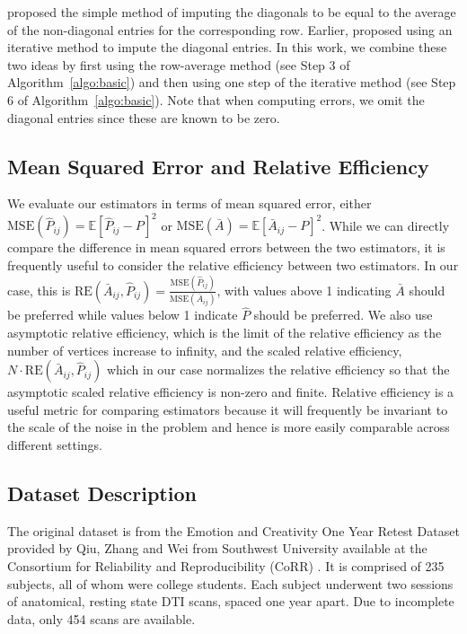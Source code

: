 \documentclass[10pt,letterpaper]{article}
\newcommand{\Ex}{\mathbb{E}}
\renewcommand{\hat}{\widehat}
\begin{document}
\citet{marchette2011vertex}  proposed the simple method of imputing the diagonals to be equal to the average of the non-diagonal entries for the corresponding row.
Earlier, \citet{scheinerman2010modeling} proposed using an iterative method to impute the diagonal entries.
In this work, we combine these two ideas by first using the row-average method  (see Step 3 of Algorithm~\ref{algo:basic}) and then using one step of the iterative method (see Step 6 of Algorithm~\ref{algo:basic}).
Note that when computing errors, we omit the diagonal entries since these are known to be zero.

\subsection{Mean Squared Error and Relative Efficiency}
\label{section:rel_eff}
We evaluate our estimators in terms of mean squared error, either $\mathrm{MSE}(\hat{P}_{ij})=\Ex[\hat{P}_{ij}-P]^2$ or $\mathrm{MSE}(\bar{A})=\Ex[\bar{A}_{ij}-P]^2$.
While we can directly compare the difference in mean squared errors between the two estimators, it is frequently useful to consider the relative efficiency between two estimators.
In our case, this is $\mathrm{RE}(\bar{A}_{ij},\hat{P}_{ij}) = \frac{\mathrm{MSE}(\hat{P}_{ij})}{\mathrm{MSE}(\bar{A}_{ij})}$, with values above 1 indicating $\bar{A}$ should be preferred while values below 1 indicate $\hat{P}$ should be preferred.
We also use asymptotic relative efficiency, which is the limit of the relative efficiency as the number of vertices increase to infinity, and the scaled relative efficiency, $N\cdot \mathrm{RE}(\bar{A}_{ij},\hat{P}_{ij}) $ which in our case normalizes the relative efficiency so that the asymptotic scaled relative efficiency is non-zero and finite.
Relative efficiency is a useful metric for comparing estimators because it will frequently be invariant to the scale of the noise in the problem and hence is more easily comparable across different settings.

\subsection{Dataset Description}
\label{section:data}
The original dataset is from the Emotion and Creativity One Year Retest Dataset provided by Qiu, Zhang and Wei from Southwest University available at the Consortium for Reliability and Reproducibility (CoRR) \citep{zuo2014open, gorgolewski2015high}. It is comprised of 235 subjects, all of whom were college students. Each subject underwent two sessions of anatomical, resting state DTI scans, spaced one year apart. Due to incomplete data, only 454 scans are available.
\end{document}
